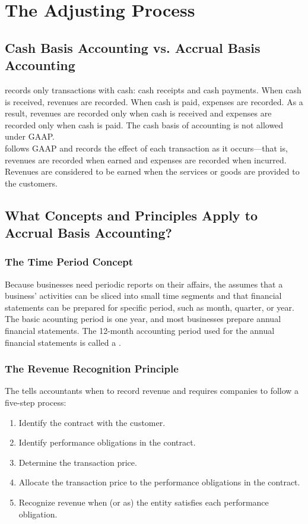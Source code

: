 \documentclass{article}
\begin{document}
\section{The Adjusting Process}

\subsection{Cash Basis Accounting vs. Accrual Basis Accounting}

 records only transactions with cash: cash receipts and cash payments. When cash is received, revenues are recorded. When cash is paid, expenses are recorded. As a result, revenues are recorded only when cash is received and expenses are recorded only when cash is paid. The cash basis of accounting is not allowed under GAAP. \\ 

 follows GAAP and records the effect of each transaction as it occurs---that is, revenues are recorded when earned and expenses are recorded when incurred. Revenues are considered to be earned when the services or goods are provided to the customers. 

\subsection{What Concepts and Principles Apply to Accrual Basis Accounting?}

\subsubsection{The Time Period Concept}

Because businesses need periodic reports on their affairs, the  assumes that a business' activities can be sliced into small time segments and that financial statements can be prepared for specific period, such as month, quarter, or year. The basic acounting period is one year, and most businesses prepare annual financial statements. The 12-month accounting period used for the annual financial statements is called a . 

\subsubsection{The Revenue Recognition Principle}

The  tells accountants when to record revenue and requires companies to follow a five-step process: 
\begin{enumerate}
  \item Identify the contract with the customer. 
  \item Identify performance obligations in the contract. 
  \item Determine the transaction price. 
  \item Allocate the transaction price to the performance obligations in the contract. 
  \item Recognize revenue when (or as) the entity satisfies each performance obligation. 
\end{enumerate}
\end{document}
